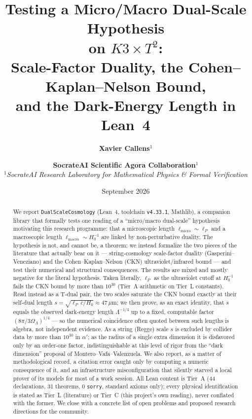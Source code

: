\documentclass[11pt,a4paper]{article}
\title{\Huge \textbf{Testing a Micro/Macro Dual-Scale Hypothesis}\\[0.3em]
\LARGE \textbf{on $K3\times T^2$:}\\[0.2em]
Scale-Factor Duality, the Cohen--Kaplan--Nelson Bound,\\
and the Dark-Energy Length in Lean~4}
\author{\textbf{Xavier Callens}$^{1}$ \and \textbf{SocrateAI Scientific Agora Collaboration}$^{1}$ \\[0.5em]
$^{1}$\textit{SocrateAI Research Laboratory for Mathematical Physics \& Formal Verification}}
\date{September 2026}
\theoremstyle{remark}
\begin{document}
\maketitle

\begin{abstract}
We report \texttt{DualScaleCosmology} (Lean~4, toolchain \texttt{v4.33.1}, Mathlib), a companion
library that formally tests one reading of a ``micro/macro dual-scale'' hypothesis motivating this
research programme: that a microscopic length $\ell_{\mathrm{micro}}\sim\ell_P$ and a macroscopic
length $\ell_{\mathrm{macro}}\sim H_0^{-1}$ are linked by non-perturbative duality. The hypothesis
is not, and cannot be, a theorem; we instead formalize the two pieces of the literature that
actually bear on it --- string-cosmology scale-factor duality (Gasperini--Veneziano) and the
Cohen--Kaplan--Nelson (CKN) ultraviolet/infrared bound --- and test their numerical and structural
consequences. The results are mixed and mostly negative for the literal hypothesis. Taken
literally, $\ell_P$ as the ultraviolet cutoff at $H_0^{-1}$ fails the CKN bound by more than
$10^{30}$ (Tier~A arithmetic on Tier~L constants). Read instead as a T-dual pair, the two scales
saturate the CKN bound exactly at their self-dual length $s=\sqrt{\ell_P\,c/H_0}\approx47\,\mu$m;
we then prove, as an exact identity, that $s$ equals the observed dark-energy length
$\Lambda^{-1/4}$ up to a fixed, computable factor $(8\pi/3\Omega_\Lambda)^{1/4}$ --- so the
numerical coincidence often quoted between such lengths is algebra, not independent evidence. As a
string (Regge) scale $s$ is excluded by collider data by more than $10^{30}$ in $\alpha'$; as the
radius of a single extra dimension it is disfavored only by an order-one factor, indistinguishable
at this level of rigor from the ``dark dimension'' proposal of Montero--Vafa--Valenzuela. We also
report, as a matter of methodological record, a citation error caught only by computing a numeric
consequence of it, and an infrastructure misconfiguration that silently starved a local prover of
its models for most of a work session. All Lean content is Tier~A (44 declarations, 31 theorems,
0 \texttt{sorry}, standard axioms only); every physical identification is stated as Tier~L
(literature) or Tier~C (this project's own reading), never conflated with the former. We close with
a concrete list of open problems and proposed research directions for the community.
\end{abstract}

\newpage
\tableofcontents
\newpage
\end{document}
